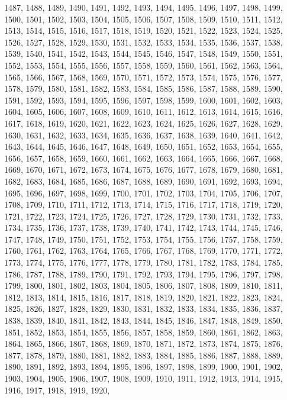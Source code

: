 1487,
1488,
1489,
1490,
1491,
1492,
1493,
1494,
1495,
1496,
1497,
1498,
1499,
1500,
1501,
1502,
1503,
1504,
1505,
1506,
1507,
1508,
1509,
1510,
1511,
1512,
1513,
1514,
1515,
1516,
1517,
1518,
1519,
1520,
1521,
1522,
1523,
1524,
1525,
1526,
1527,
1528,
1529,
1530,
1531,
1532,
1533,
1534,
1535,
1536,
1537,
1538,
1539,
1540,
1541,
1542,
1543,
1544,
1545,
1546,
1547,
1548,
1549,
1550,
1551,
1552,
1553,
1554,
1555,
1556,
1557,
1558,
1559,
1560,
1561,
1562,
1563,
1564,
1565,
1566,
1567,
1568,
1569,
1570,
1571,
1572,
1573,
1574,
1575,
1576,
1577,
1578,
1579,
1580,
1581,
1582,
1583,
1584,
1585,
1586,
1587,
1588,
1589,
1590,
1591,
1592,
1593,
1594,
1595,
1596,
1597,
1598,
1599,
1600,
1601,
1602,
1603,
1604,
1605,
1606,
1607,
1608,
1609,
1610,
1611,
1612,
1613,
1614,
1615,
1616,
1617,
1618,
1619,
1620,
1621,
1622,
1623,
1624,
1625,
1626,
1627,
1628,
1629,
1630,
1631,
1632,
1633,
1634,
1635,
1636,
1637,
1638,
1639,
1640,
1641,
1642,
1643,
1644,
1645,
1646,
1647,
1648,
1649,
1650,
1651,
1652,
1653,
1654,
1655,
1656,
1657,
1658,
1659,
1660,
1661,
1662,
1663,
1664,
1665,
1666,
1667,
1668,
1669,
1670,
1671,
1672,
1673,
1674,
1675,
1676,
1677,
1678,
1679,
1680,
1681,
1682,
1683,
1684,
1685,
1686,
1687,
1688,
1689,
1690,
1691,
1692,
1693,
1694,
1695,
1696,
1697,
1698,
1699,
1700,
1701,
1702,
1703,
1704,
1705,
1706,
1707,
1708,
1709,
1710,
1711,
1712,
1713,
1714,
1715,
1716,
1717,
1718,
1719,
1720,
1721,
1722,
1723,
1724,
1725,
1726,
1727,
1728,
1729,
1730,
1731,
1732,
1733,
1734,
1735,
1736,
1737,
1738,
1739,
1740,
1741,
1742,
1743,
1744,
1745,
1746,
1747,
1748,
1749,
1750,
1751,
1752,
1753,
1754,
1755,
1756,
1757,
1758,
1759,
1760,
1761,
1762,
1763,
1764,
1765,
1766,
1767,
1768,
1769,
1770,
1771,
1772,
1773,
1774,
1775,
1776,
1777,
1778,
1779,
1780,
1781,
1782,
1783,
1784,
1785,
1786,
1787,
1788,
1789,
1790,
1791,
1792,
1793,
1794,
1795,
1796,
1797,
1798,
1799,
1800,
1801,
1802,
1803,
1804,
1805,
1806,
1807,
1808,
1809,
1810,
1811,
1812,
1813,
1814,
1815,
1816,
1817,
1818,
1819,
1820,
1821,
1822,
1823,
1824,
1825,
1826,
1827,
1828,
1829,
1830,
1831,
1832,
1833,
1834,
1835,
1836,
1837,
1838,
1839,
1840,
1841,
1842,
1843,
1844,
1845,
1846,
1847,
1848,
1849,
1850,
1851,
1852,
1853,
1854,
1855,
1856,
1857,
1858,
1859,
1860,
1861,
1862,
1863,
1864,
1865,
1866,
1867,
1868,
1869,
1870,
1871,
1872,
1873,
1874,
1875,
1876,
1877,
1878,
1879,
1880,
1881,
1882,
1883,
1884,
1885,
1886,
1887,
1888,
1889,
1890,
1891,
1892,
1893,
1894,
1895,
1896,
1897,
1898,
1899,
1900,
1901,
1902,
1903,
1904,
1905,
1906,
1907,
1908,
1909,
1910,
1911,
1912,
1913,
1914,
1915,
1916,
1917,
1918,
1919,
1920,
